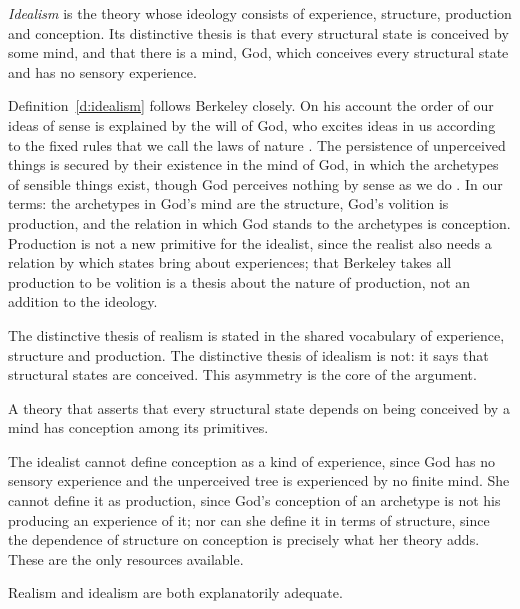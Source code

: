 \documentclass{situationist-preprint}
\begin{document}
\begin{definition}[Idealism]\label{d:idealism}
\emph{Idealism} is the theory whose ideology consists of experience, structure, production and conception. Its distinctive thesis is that every structural state is conceived by some mind, and that there is a mind, God, which conceives every structural state and has no sensory experience.
\end{definition}

Definition~\ref{d:idealism} follows Berkeley closely. On his account the order of our ideas of sense is explained by the will of God, who excites ideas in us according to the fixed rules that we call the laws of nature \citep[\S\S 29--33]{BerkeleyPrinciples}. The persistence of unperceived things is secured by their existence in the mind of God, in which the archetypes of sensible things exist, though God perceives nothing by sense as we do \citep[third dialogue]{BerkeleyDialogues}. In our terms: the archetypes in God's mind are the structure, God's volition is production, and the relation in which God stands to the archetypes is conception. Production is not a new primitive for the idealist, since the realist also needs a relation by which states bring about experiences; that Berkeley takes all production to be volition is a thesis about the nature of production, not an addition to the ideology.

The distinctive thesis of realism is stated in the shared vocabulary of experience, structure and production. The distinctive thesis of idealism is not: it says that structural states are conceived. This asymmetry is the core of the argument.

\begin{assumption}\label{a:indef}
A theory that asserts that every structural state depends on being conceived by a mind has conception among its primitives.
\end{assumption}

The idealist cannot define conception as a kind of experience, since God has no sensory experience and the unperceived tree is experienced by no finite mind. She cannot define it as production, since God's conception of an archetype is not his producing an experience of it; nor can she define it in terms of structure, since the dependence of structure on conception is precisely what her theory adds. These are the only resources available.

\begin{assumption}\label{a:both}
Realism and idealism are both explanatorily adequate.
\end{assumption}
\end{document}
